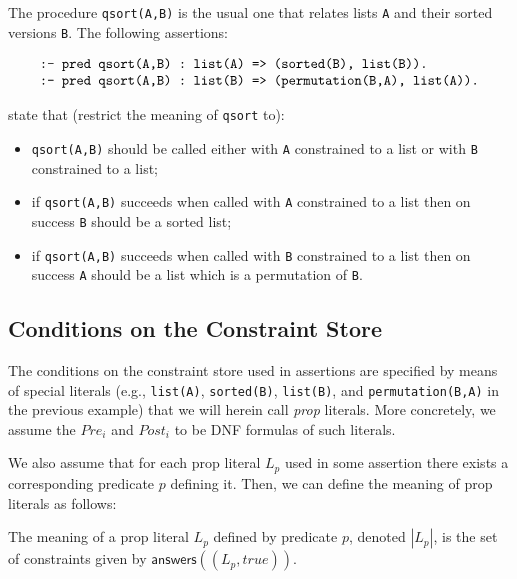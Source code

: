 \documentclass{llncs}
\newcommand{\kbd}[1]{\mbox{\tt #1}}
\newcommand{\skbd}[1]{\mbox{\tt\small{#1}}}
\newcommand{\answers}[1]{\ensuremath{\textsf{answers}(#1)}}
\begin{document}
\begin{example}
  \label{ex:qsortasrt}
  The procedure \skbd{qsort(A,B)} is the usual one 
  that relates lists \skbd{A} and their sorted versions \skbd{B}. 
  The following assertions:
\begin{small}
    \[
    \begin{array}{l}
      \kbd{:- pred qsort(A,B) : list(A) => (sorted(B), list(B)).}
    \\
      \kbd{:- pred qsort(A,B) : list(B) => (permutation(B,A), 
      list(A)).}
    \end{array}
    \]
  \end{small}
state that (restrict the meaning of \kbd{qsort} to):
  \vspace{-0.8em}
  \begin{itemize}
    \item \skbd{qsort(A,B)} should be called either with \skbd{A}
      constrained to a list or with \kbd{B} constrained to a list;
    \item if \skbd{qsort(A,B)} succeeds when called with \skbd{A}
      constrained to a list then on success \skbd{B} should be a
      sorted list; 
    \item if \skbd{qsort(A,B)} succeeds when called with \skbd{B}
      constrained to a list then on success \skbd{A} should be a list
      which is a permutation of \skbd{B}.
  \end{itemize}
\end{example}



\subsection{Conditions on the Constraint Store}

The conditions on the constraint store used in assertions are
specified by means of special literals (e.g., \skbd{list(A)},
\skbd{sorted(B)}, \skbd{list(B)}, and \skbd{permutation(B,A)}
in the previous example) that we will herein call \emph{prop}
literals. More concretely, we assume the $Pre_i$ and $Post_i$ to be
DNF formulas of such literals.

We also assume that for each prop literal $L_p$ used in some
assertion there exists a corresponding predicate $p$ defining it.
Then, we can define the meaning of prop literals as follows:

\begin{definition} 
  The meaning of a prop literal $L_p$ defined by predicate $p$,
  denoted $|L_p|$, is the set of constraints given by
  $\answers{(L_p,true)}$.
\end{definition}
\end{document}
